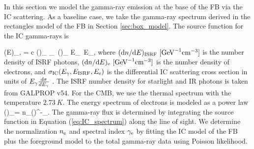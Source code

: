 In this section we model the gamma-ray emission at the base of the FB via the IC scattering.
As a baseline case, we take the gamma-ray spectrum derived in the rectangles model of the FB in Section \ref{sec:box_model}.
The source function for the IC gamma-rays is

\be
\label{eq:IC_spectrum}
\left(E\right)_{\!\!\gamma,\IC}\! = c\int\!\! \int \left(\right)_{\!\!\ISRF} \sigma_\IC\ \left(\right)_{\!\!\el} \de E_\ISRF\, \de E_\el,
\ee
where $(\text{d} n/ \text{d} E)_{\text{ISRF}}\ [\SI{}{GeV^{-1} cm^{-3}}]$ is the number density of ISRF photons,
$(\text{d} n / \text{d} E)_{\text{e}}\ [\SI{}{GeV^{-1} cm^{-3}}]$ is the number density of electrons, and $\sigma_{\text{IC}}(E_\gamma, E_{\text{ISRF}}, E_{\text{e}})$
is the differential IC scattering cross section in units of $E_\gamma\frac{d\sigma}{d E_\gamma}$ \citep{1970RvMP...42..237B}.
The ISRF number density for starlight and IR photons is taken from GALPROP v54.
For the CMB, we use the thermal spectrum with the temperature $\SI{2.73}{K}$.
The energy spectrum of electrons is modeled as a power law 
\be 
\label{eq:e_spectrum}
\left(\right)_\el = n_\el \left(\right)^{-\gamma_\el}. %
\ee
The gamma-ray flux is determined by integrating the source function in Equation (\ref{eq:IC_spectrum}) along the line of sight.
We determine the normalization $n_{\text{e}}$ and spectral index $\gamma_{\text{e}}$  by fitting the IC model of the FB plus the foreground model to the 
total gamma-ray data using Poisson likelihood. 

